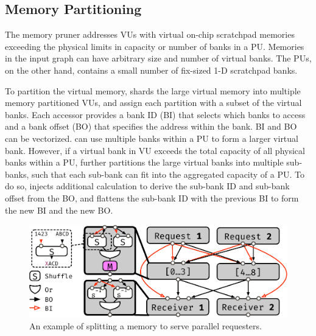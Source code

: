 \subsection{Memory Partitioning} \label{sec:memsplit}
The memory pruner addresses VUs with virtual on-chip scratchpad memories exceeding the physical limits in capacity or number of banks in a PU.
Memories in the input graph can have arbitrary size and number of virtual banks.
The PUs, on the other hand, contains a small number of fix-sized 1-D scratchpad banks.

To partition the virtual memory, \name{} shards the large virtual memory into multiple memory partitioned VUs, and assign each partition with a subset of the virtual banks.
Each accessor provides a bank ID (BI) that selects which banks to access and a bank offset (BO) that specifies the address within the bank. 
BI and BO can be vectorized.
\name{} can use multiple banks within a PU to form a larger virtual bank.
However, if a virtual bank in VU exceeds the total capacity of all physical banks within a PU, \name{} further partitions the large virtual banks into multiple sub-banks, such that each sub-bank can fit into the aggregated capacity of a PU.
To do so, \name{} injects additional calculation to derive the sub-bank ID and sub-bank offset from the BO, and flattens the sub-bank ID with the previous BI to form the new BI and the new BO.


\begin{figure}
  \centering
  \includegraphics[width=1\columnwidth]{figs/memsplit.pdf}
  \caption{An example of splitting a memory to serve parallel requesters.}
  \label{fig:memsplit}
\end{figure}

